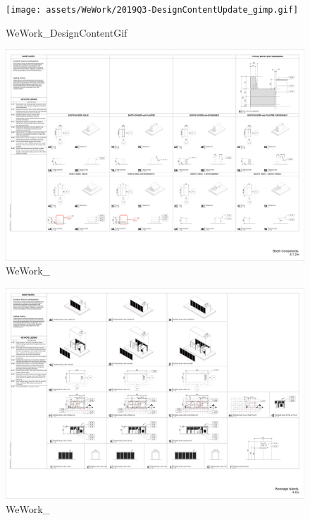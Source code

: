 \documentclass[
]{article}
\begin{document}
\begin{figure}[H]

{\centering \texttt{[image: assets/WeWork/2019Q3-DesignContentUpdate\_gimp.gif]}

}

\caption{WeWork\_DesignContentGif}

\end{figure}%
\begin{figure}[H]

{\centering \includegraphics{assets/WeWork/ww_design_standards-16.png}

}

\caption{WeWork\_}

\end{figure}%
\begin{figure}[H]

{\centering \includegraphics{assets/WeWork/ww_design_standards-19.png}

}

\caption{WeWork\_}

\end{figure}%
\end{document}
